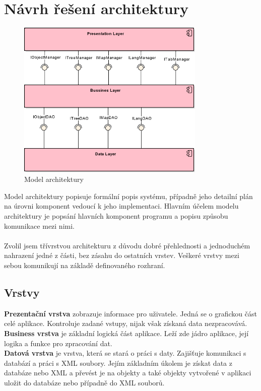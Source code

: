 \documentclass[thesis=B,czech]{resources/FITthesis}[2012/06/26]
\begin{document}
	\section{Návrh řešení architektury}
\begin{figure}\centering
	\includegraphics[width=0.8\textwidth]{images/architektura}
	\caption[Model architektury]{Model architektury}\label{fig:architektura}
\end{figure}
Model architektury popisuje formální popis systému, případně jeho detailní plán na úrovni komponent vedoucí k jeho implementaci. Hlavním účelem modelu architektury je popsání hlavních komponent programu a popisu způsobu komunikace mezi nimi.\\
\\
Zvolil jsem třívrstvou architekturu z důvodu dobré přehlednosti a jednoduchém nahrazení jedné z části, bez zásahu do ostatních vrstev. Veškeré vrstvy mezi sebou komunikují na základě definovaného rozhraní.\\
\subsection{Vrstvy}
\textbf{Prezentační vrstva} zobrazuje informace pro uživatele. Jedná se o grafickou část celé aplikace. Kontroluje zadané vstupy, nijak však získaná data nezpracovává.\\
\textbf{Business vrstva} je základní logická část aplikace. Leží zde jádro aplikace, její logika a funkce pro zpracování dat.\\
\textbf{Datová vrstva} je vrstva, která se stará o práci s daty. Zajišťuje komunikaci s databází a práci s XML soubory. Jejím základním úkolem je získat data z databáze nebo XML a převést je na objekty a také objekty vytvořené v aplikaci uložit do databáze nebo případně do XML souborů. \\
\end{document}
